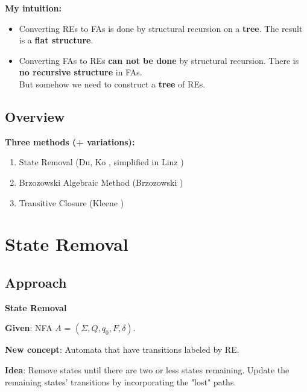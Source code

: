 \documentclass{beamer}
\begin{document}
\begin{frame}
    \textbf{My intuition:} 
    \begin{itemize}
        \item
            Converting REs to FAs is done by structural recursion on a \textbf{tree}. The result is a \textbf{flat structure}.

            \pause

        \item
            Converting FAs to REs \textbf{can not be done} by structural recursion.
            There is \textbf{no recursive structure} in FAs. \\
            But somehow we need to construct a \textbf{tree} of REs.
    \end{itemize}



\end{frame}

\subsection*{Overview}
\begin{frame}

    \textbf{Three methods (+ variations):}

    \begin{enumerate}
        \item State Removal (Du, Ko \cite{DuKo}, simplified in Linz \cite{DBLP:books/daglib/0019552})
        \item Brzozowski Algebraic Method (Brzozowski \cite{DBLP:journals/jacm/Brzozowski64})
        \item Transitive Closure (Kleene \cite{KleeneNets})
    \end{enumerate}

\end{frame}


\section{State Removal}
\subsection*{Approach}
\begin{frame}
    \textbf{State Removal}    

    \textbf{Given}: NFA $A$ = $(\Sigma, Q, q_0, F, \delta)$.

    \textbf{New concept}: Automata that have transitions labeled by RE.

    \textbf{Idea}: Remove states until there are two or less states remaining. Update the remaining states' transitions by incorporating the "lost" paths.


\end{frame}
\end{document}
